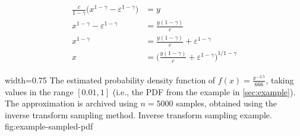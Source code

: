 \begin{align}
\begin{split}
	\frac{c}{1-\gamma} \Big( x^{1 - \gamma} - \varepsilon^{1 - \gamma} \Big) & = y \\
    x^{1-\gamma} - \varepsilon^{1-\gamma} & = \frac{y(1-\gamma)}{c} \\
    x^{1-\gamma} & = \frac{y(1-\gamma)}{c} + \varepsilon^{1-\gamma} \\
    x & = \Big( \frac{y(1-\gamma)}{c} + \varepsilon^{1-\gamma} \Big)^{1/1-\gamma}
\end{split}
\label{eq:inverese-cdf}
\end{align}


      {width=0.75\textwidth}
      {The estimated probability density function of \(f(x) = \frac{x^{-2.5}}{666}\), taking values in the range \([0.01, 1]\) (i.e., the PDF from the example in \cref{sec:example}). The approximation is archived using \(n = 5000\) samples, obtained using the inverse transform sampling method.}
      {Inverse transform sampling example.}
      {fig:example-sampled-pdf}

